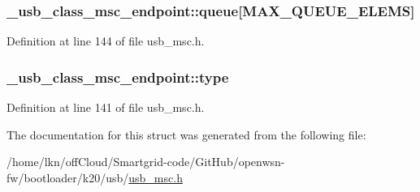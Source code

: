 \subsubsection[{\texorpdfstring{queue}{queue}}]{ \+\_\+usb\+\_\+class\+\_\+msc\+\_\+endpoint\+::queue\mbox{[}{\bf M\+A\+X\+\_\+\+Q\+U\+E\+U\+E\+\_\+\+E\+L\+E\+MS}\mbox{]}}\hypertarget{struct__usb__class__msc__endpoint_afbe87d35209635fc98c6c61dea49d9f0}{}\label{struct__usb__class__msc__endpoint_afbe87d35209635fc98c6c61dea49d9f0}


Definition at line 144 of file usb\+\_\+msc.\+h.

\subsubsection[{\texorpdfstring{type}{type}}]{ \+\_\+usb\+\_\+class\+\_\+msc\+\_\+endpoint\+::type}\hypertarget{struct__usb__class__msc__endpoint_a9f97434fb32c7e4aa79a6a8eade31fed}{}\label{struct__usb__class__msc__endpoint_a9f97434fb32c7e4aa79a6a8eade31fed}


Definition at line 141 of file usb\+\_\+msc.\+h.



The documentation for this struct was generated from the following file\+:\begin{DoxyCompactItemize}
\item 
/home/lkn/off\+Cloud/\+Smartgrid-\/code/\+Git\+Hub/openwsn-\/fw/bootloader/k20/usb/\hyperlink{usb__msc_8h}{usb\+\_\+msc.\+h}\end{DoxyCompactItemize}
